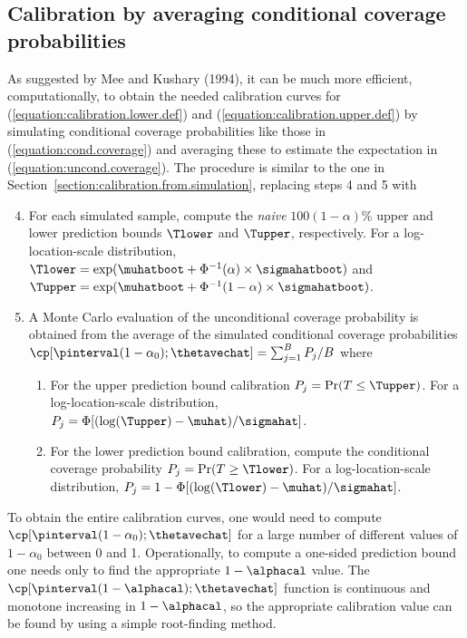 \subsection{Calibration by averaging conditional coverage probabilities}
\label{section:calibration.from.prob.aver}
As suggested by Mee and Kushary (1994), it can be much more
efficient, computationally, to obtain the needed calibration curves
for (\ref{equation:calibration.lower.def}) and
(\ref{equation:calibration.upper.def}) by simulating conditional
coverage probabilities like those in (\ref{equation:cond.coverage})
and averaging these to estimate the expectation in
(\ref{equation:uncond.coverage}).  The procedure is similar to the
one in Section~\ref{section:calibration.from.simulation}, replacing
steps 4 and 5 with
\begin{enumerate}
\setcounter{enumi}{3}
\item
For each simulated sample, compute the {\em naive} $100(1-\alpha)$\%
upper and lower prediction bounds $\Tlower$ and $\Tupper$, respectively. 
For a log-location-scale distribution, $\Tlower=\exp(\muhatboot +
\Phi^{-1}(\alpha) \times \sigmahatboot)$ and $\Tupper=\exp(\muhatboot +
\Phi^{-1}(1-\alpha) \times \sigmahatboot)$.
\item
A Monte Carlo evaluation of the unconditional coverage probability
is obtained from the average of the simulated conditional coverage
probabilities $\cp[\pinterval(1-\alpha_{0})
;\thetavechat]=\sum_{j=1}^{B}P_{j}/B$ where
\begin{enumerate}
\item
For the upper prediction bound calibration
$P_{j}= \Pr(T \leq \Tupper)$.  For a
log-location-scale distribution,
$P_{j}=\Phi[(\log(\Tupper)-\muhat)/\sigmahat]$.
\item
For the lower prediction bound calibration, compute the conditional
coverage probability $P_{j}= \Pr(T \geq \Tlower)$.  For a
log-location-scale distribution,
$P_{j}=1 - \Phi[(\log(\Tlower)-\muhat)/\sigmahat]$.
\end{enumerate}
\end{enumerate}

To obtain the entire calibration curves, one would need to compute
$\cp[\pinterval(1-\alpha_{0}) ;\thetavechat]$ for a large number of
different values of $1-\alpha_{0}$ between 0 and 1. Operationally,
to compute a one-sided prediction bound one needs only to find the
appropriate $1-\alphacal$ value.  The
$\cp[\pinterval(1-\alphacal) ;\thetavechat]$ function is
continuous and monotone increasing in $1-\alphacal$, so the
appropriate calibration value can be found by using a simple
root-finding method.

